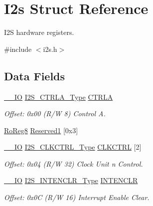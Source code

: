 \hypertarget{struct_i2s}{}\section{I2s Struct Reference}
\label{struct_i2s}


I2S hardware registers.  




{\ttfamily \#include $<$i2s.\+h$>$}

\subsection*{Data Fields}
\begin{DoxyCompactItemize}
\item 
\mbox{\hyperlink{core__cm0plus_8h_aec43007d9998a0a0e01faede4133d6be}{\+\_\+\+\_\+\+IO}} \mbox{\hyperlink{union_i2_s___c_t_r_l_a___type}{I2\+S\+\_\+\+C\+T\+R\+L\+A\+\_\+\+Type}} \mbox{\hyperlink{struct_i2s_a9283c3350b6c2e04296fed8cf61be81b}{C\+T\+R\+LA}}
\begin{DoxyCompactList}\small\item\em Offset\+: 0x00 (R/W 8) Control A. \end{DoxyCompactList}\item 
\mbox{\hyperlink{group___s_a_m_d21_e15_a__definitions_ga0d957f1433aaf5d70e4dc2b68288442d}{Ro\+Reg8}} \mbox{\hyperlink{struct_i2s_a0ec4ccebd5bfbf4f17510e15a5a9ff81}{Reserved1}} \mbox{[}0x3\mbox{]}
\item 
\mbox{\hyperlink{core__cm0plus_8h_aec43007d9998a0a0e01faede4133d6be}{\+\_\+\+\_\+\+IO}} \mbox{\hyperlink{union_i2_s___c_l_k_c_t_r_l___type}{I2\+S\+\_\+\+C\+L\+K\+C\+T\+R\+L\+\_\+\+Type}} \mbox{\hyperlink{struct_i2s_a8b353c4384f259f83f4cb09005733121}{C\+L\+K\+C\+T\+RL}} \mbox{[}2\mbox{]}
\begin{DoxyCompactList}\small\item\em Offset\+: 0x04 (R/W 32) Clock Unit n Control. \end{DoxyCompactList}\item 
\mbox{\hyperlink{core__cm0plus_8h_aec43007d9998a0a0e01faede4133d6be}{\+\_\+\+\_\+\+IO}} \mbox{\hyperlink{union_i2_s___i_n_t_e_n_c_l_r___type}{I2\+S\+\_\+\+I\+N\+T\+E\+N\+C\+L\+R\+\_\+\+Type}} \mbox{\hyperlink{struct_i2s_a74d9fa452e3c9c2c39e61ce72320c4b9}{I\+N\+T\+E\+N\+C\+LR}}
\begin{DoxyCompactList}\small\item\em Offset\+: 0x0C (R/W 16) Interrupt Enable Clear. \end{DoxyCompactList}\item 

\end{DoxyCompactItemize}
